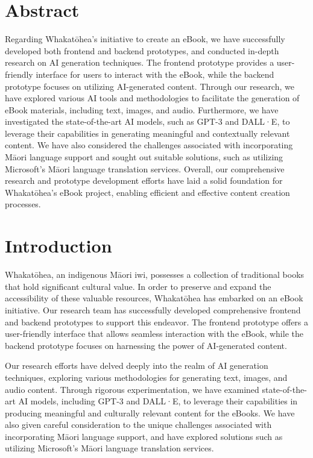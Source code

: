 \chapter{Abstract}

Regarding Whakatōhea's initiative to create an eBook, we have successfully developed both frontend and backend prototypes, and conducted in-depth research on AI generation techniques. The frontend prototype provides a user-friendly interface for users to interact with the eBook, while the backend prototype focuses on utilizing AI-generated content. Through our research, we have explored various AI tools and methodologies to facilitate the generation of eBook materials, including text, images, and audio. Furthermore, we have investigated the state-of-the-art AI models, such as GPT-3 and DALL·E, to leverage their capabilities in generating meaningful and contextually relevant content. We have also considered the challenges associated with incorporating Māori language support and sought out suitable solutions, such as utilizing Microsoft's Māori language translation services. Overall, our comprehensive research and prototype development efforts have laid a solid foundation for Whakatōhea's eBook project, enabling efficient and effective content creation processes.

\chapter{Introduction}

Whakatōhea, an indigenous Māori iwi, possesses a collection of traditional books that hold significant cultural value. In order to preserve and expand the accessibility of these valuable resources, Whakatōhea has embarked on an eBook initiative. Our research team has successfully developed comprehensive frontend and backend prototypes to support this endeavor. The frontend prototype offers a user-friendly interface that allows seamless interaction with the eBook, while the backend prototype focuses on harnessing the power of AI-generated content.

Our research efforts have delved deeply into the realm of AI generation techniques, exploring various methodologies for generating text, images, and audio content. Through rigorous experimentation, we have examined state-of-the-art AI models, including GPT-3 and DALL·E, to leverage their capabilities in producing meaningful and culturally relevant content for the eBooks. We have also given careful consideration to the unique challenges associated with incorporating Māori language support, and have explored solutions such as utilizing Microsoft's Māori language translation services.

